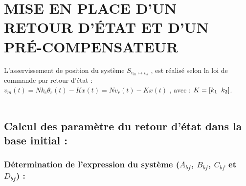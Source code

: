 \documentclass[12pt, a4paper, openany]{report}
\begin{document}











 \chapter{MISE EN PLACE D’UN RETOUR D’ÉTAT ET D’UN PRÉ-COMPENSATEUR}

L'asservissement de position du système $S_{v_{m}\longmapsto v_{s}}$ , est réalisé selon la loi de commande par retour d'état :\\
 $v_{m}(t)=Nk_{e}\theta_{r}(t)-Kx(t)=Nv_{r}(t)-Kx(t)$ , avec : $K=[k_{1} \hspace{2mm} k_{2}]$.\\\\
 
 \section{Calcul des paramètre du retour d'état dans la base initial :}
 
\subsection{Détermination de l'expression du système ($A_{bf}$, $B_{bf}$, $C_{bf}$ et $D_{bf}$) :}
\end{document}
